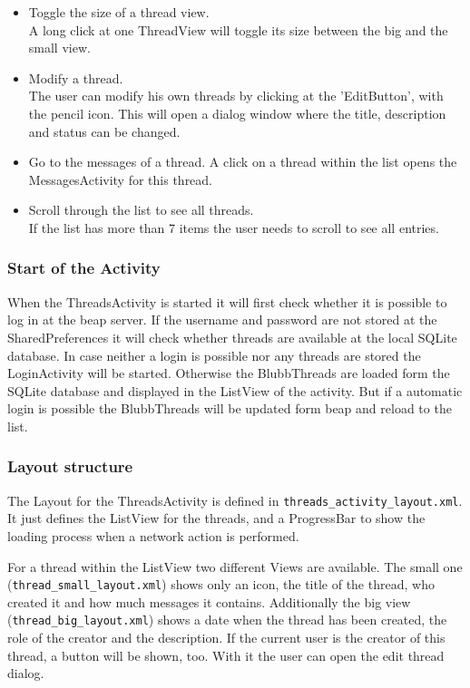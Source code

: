 \documentclass[12pt,a4paper,oneside]{report}
\newcommand{\beapServer}{beap server}
\newcommand{\code}[1]{\lstinline{#1}}
\begin{document}
\begin{itemize}
\item{Toggle the size of  a thread view.}\\
A long click at one ThreadView will toggle its size between the big and the small view.

\item{Modify a thread.}\\
The user can modify his own threads by clicking at the 'EditButton', with the pencil icon. This will open a dialog window where the title, description and status can be changed.

\item{Go to the messages of a thread.}
A click on a thread within the list opens the MessagesActivity for this thread. 

\item{Scroll through the list to see all threads.}\\
If the list has more than 7 items the user needs to scroll to see all entries.

\end{itemize} 

\subsubsection{Start of the Activity}
When the ThreadsActivity is started it will first check whether it is possible to log in at the \beapServer{}. If the username and password are not stored at the SharedPreferences it will check whether threads are available at the local SQLite database. In case neither a login is possible nor any threads are stored the LoginActivity will be started. Otherwise the BlubbThreads are loaded form the SQLite database and displayed in the ListView of the activity. But if a automatic login is possible the BlubbThreads will be updated form beap and reload to the list.

\subsubsection{Layout structure}
The Layout for the ThreadsActivity is defined in \code{threads_activity_layout.xml}.
It just defines the ListView for the threads, and a ProgressBar to show the loading process when a network action is performed. 

For a thread within the ListView two different Views are available. The small one (\code{thread_small_layout.xml}) shows only an icon, the title of the thread, who created it and how much messages it contains. Additionally the big view (\code{thread_big_layout.xml}) shows a date when the thread has been created, the role of the creator and the description. If the current user is the creator of this thread, a button will be shown, too. With it the user can open the edit thread dialog. 
\end{document}

